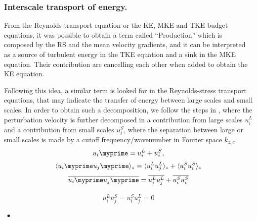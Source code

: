 
\subsubsection{Interscale transport of energy.}

From the Reynolds transport equation or the KE, MKE and TKE budget equations, it was possible to obtain a term called ``Production'' which is composed by the RS and the mean velocity gradients, and it can be interpreted as a source of turbulent energy in the TKE equation and a sink in the MKE equation. Their contribution are cancelling each other when added to obtain the KE equation.

Following this idea, a similar term is looked for in the Reynolds-stress transport equations, that may indicate the transfer of energy between large scales and small scales.
In order to obtain such a decomposition, we follow the steps in \cite{PRL2018_Kawata, JFM2019_kawata_alfredsson}, where the perturbation velocity is further decomposed in a contribution from large scales $u_i^L$ and a contribution from small scales $u_i^S$, where the separation between large or small scales is made by a cutoff frequency/wavenumber in Fourier space $k_{z,c}$.
\begin{equation}
    \label{eq:intersc_decomp}
    u_i\myprime = u_i^L + u_i^S,
\end{equation}
\begin{equation}
    \label{eq:intersc_decomp}
    \langle u_i\myprime u_j\myprime \rangle_z = 
    \langle u_i^L u_j^L \rangle_z + 
    \langle u_i^S u_i^S \rangle_z
\end{equation}
\begin{equation}
    \label{eq:intersc_decomp}
    \overline{u_i\myprime u_j\myprime} = 
    \overline{ u_i^L u_j^L} + 
    \overline{ u_i^S u_i^S}
\end{equation}

\begin{equation}
    \label{eq:intersc_decomp}
    \overline{ u_i^L u_j^S} = 
    \overline{ u_i^S u_j^L} = 0
\end{equation}



\begin{itemize}
    \item 
\end{itemize}